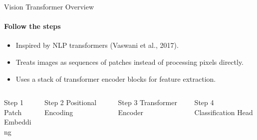 \begin{frame}{Vision Transformer Overview}
  \framesubtitle{Follow the steps}
  \begin{itemize}
    \item Inspired by NLP transformers (Vaswani et al., 2017).
    \item Treats images as sequences of patches instead of processing pixels directly.
    \item Uses a stack of transformer encoder blocks for feature extraction.
  \end{itemize}
  \begin{columns}
    \begin{column}{0.2\textwidth}
      \begin{block}{Step 1}
        Patch \\ Embedding
      \end{block}
    \end{column}
    \begin{column}{0.2\textwidth}
      \begin{block}{Step 2}
        Positional Encoding
      \end{block}
    \end{column}
    \begin{column}{0.2\textwidth}
      \begin{block}{Step 3}
        Transformer Encoder
      \end{block}
    \end{column}
    \begin{column}{0.2\textwidth}
      \begin{block}{Step 4}
        Classification Head
      \end{block}
    \end{column}
  \end{columns}
\end{frame}